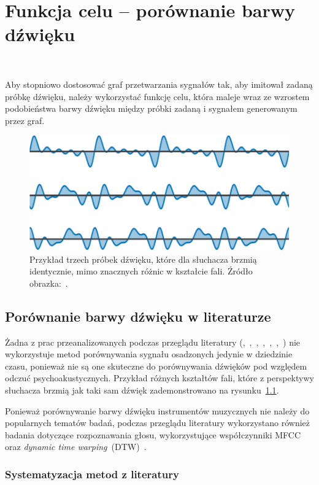 \chapter{Funkcja celu -- porównanie barwy dźwięku}~\label{target_function_chapter}

Aby stopniowo dostosować graf przetwarzania sygnałów tak, aby imitował zadaną próbkę dźwięku,
należy wykorzystać funkcję celu, która maleje wraz ze wzrostem podobieństwa
barwy dźwięku między próbki zadaną i sygnałem generowanym przez graf.

\begin{figure}[H]\label{fig:waveform_not_equal_to_perception}
    \centering
    \includegraphics[width=0.45\linewidth]{rys03/d_dsp_example_graph.png}
    \caption{
      Przykład trzech próbek dźwięku, które dla słuchacza brzmią identycznie, mimo
      znacznych różnic w kształcie fali. Źródło obrazka:~\cite{engel2020ddsp}.
    }
\end{figure}

\section{Porównanie barwy dźwięku w literaturze}\label{sec:timbre_comparison_literature_overview}

Żadna z prac przeanalizowanych podczas przeglądu literatury
(\cite{engel2020ddsp},~\cite{ieee_synth_programming},~\cite{ddx7},~\cite{riffusion},~\cite{evolutionary_puredata},~\cite{parallel_evolutionary_optimization_synth_parameters},~\cite{mfcc_dtw})
nie wykorzystuje metod porównywania sygnału osadzonych jedynie w dziedzinie czasu, ponieważ
nie są one skuteczne do porównywania dźwięków pod względem odczuć psychoakustycznych.
Przykład różnych kształtów fali, które z perspektywy słuchacza brzmią jak
taki sam dźwięk zademonstrowano na rysunku~\ref{fig:waveform_not_equal_to_perception}.

Ponieważ porównywanie barwy dźwięku instrumentów muzycznych nie należy do popularnych
tematów badań, podczas przeglądu literatury wykorzystano również badania dotyczące
rozpoznawania głosu, wykorzystujące współczynniki MFCC oraz
\textit{dynamic time warping}~(DTW)~\cite{mfcc_dtw}.

\subsection{Systematyzacja metod z literatury}~\label{sec:timbre_comparison_systematisation}

